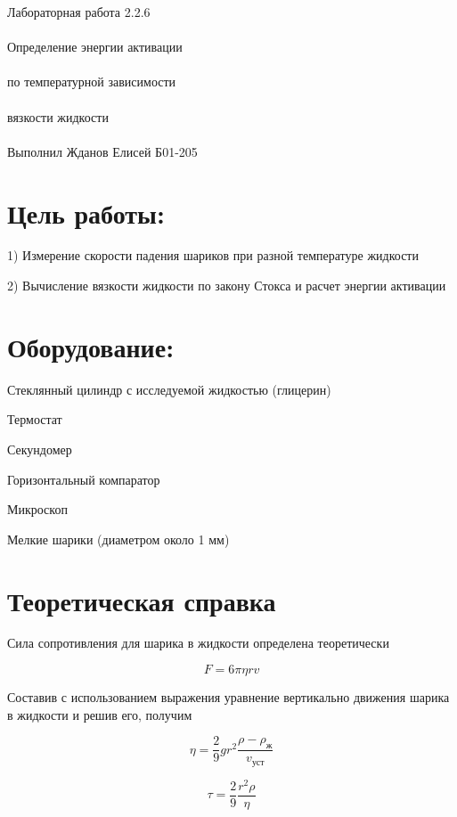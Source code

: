 \documentclass{astroedu-lab}
\begin{document}
\pagestyle{plain}

\begin{problem}{\huge Лабораторная работа 2.2.6\\\\Определение энергии активации\\\\по температурной зависимости\\\\вязкости жидкости\\\\Выполнил Жданов Елисей Б01-205}

\section{Цель работы:}

1) Измерение скорости падения шариков при разной температуре жидкости

2) Вычисление вязкости жидкости по закону Стокса и расчет энергии активации

\section{Оборудование:}

Стеклянный цилиндр с исследуемой жидкостью (глицерин)

Термостат

Секундомер

Горизонтальный компаратор

Микроскоп

Мелкие шарики (диаметром около 1 мм)

\section{Теоретическая справка}

Сила сопротивления для шарика в жидкости определена теоретически

\begin{equation}
	F = 6 \pi \eta r v
\end{equation}

Составив с использованием выражения уравнение вертикально движения шарика в жидкости и решив его, получим

\begin{equation}
	\eta = \frac{2}{9} g r^2 \frac{\rho - \rho_\text{ж}}{v_\text{уст}}
\end{equation}

\begin{equation}
	\tau = \frac{2}{9} \frac{r^2 \rho}{\eta}
\end{equation}


\end{problem}
\end{document}
